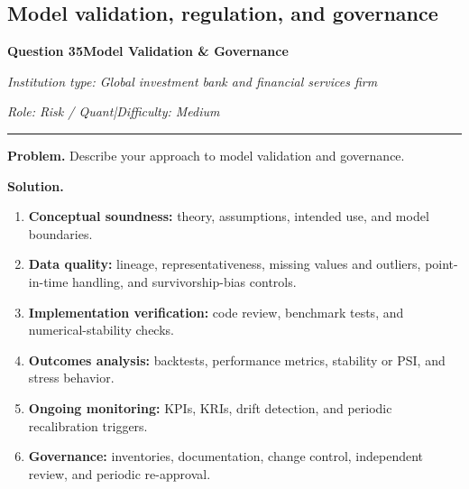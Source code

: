 \documentclass[11pt,letterpaper,openany]{book}
\newcommand{\QuestionSpacer}{\vspace{0.4em}}
\newcommand{\InterviewQuestionHeader}[5]{%
  \vspace{1.0em}%
  {\large\bfseries #1\enspace #4\par}%
  {\small\itshape Institution type: #2\par}%
  {\small\itshape Role: #3\enspace |\enspace Difficulty: #5\par}%
  \vspace{0.25em}\hrule\vspace{0.45em}%
}
\begin{document}
\QuestionSpacer

\subsection{Model validation, regulation, and governance}

\InterviewQuestionHeader{Question 35}{Global investment bank and financial services firm}{Risk / Quant}{Model Validation \& Governance}{Medium}
\textbf{Problem.} Describe your approach to model validation and governance.

\textbf{Solution.}

\begin{enumerate}
\item \textbf{Conceptual soundness:} theory, assumptions, intended use, and model boundaries.
\item \textbf{Data quality:} lineage, representativeness, missing values and outliers, point-in-time handling, and survivorship-bias controls.
\item \textbf{Implementation verification:} code review, benchmark tests, and numerical-stability checks.
\item \textbf{Outcomes analysis:} backtests, performance metrics, stability or PSI, and stress behavior.
\item \textbf{Ongoing monitoring:} KPIs, KRIs, drift detection, and periodic recalibration triggers.
\item \textbf{Governance:} inventories, documentation, change control, independent review, and periodic re-approval.
\end{enumerate}
\end{document}

